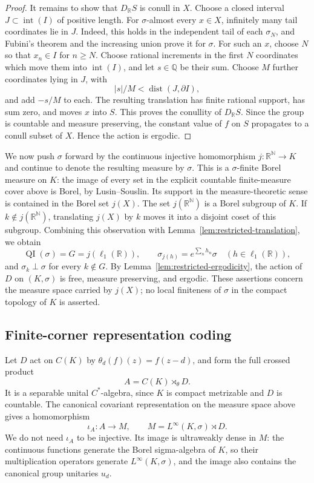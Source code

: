 \documentclass[11pt]{article}
\numberwithin{equation}{section}
\theoremstyle{definition}
\newcommand{\N}{\mathbb N}
\newcommand{\R}{\mathbb R}
\newcommand{\Q}{\mathbb Q}
\newcommand{\QI}{\operatorname{QI}}
\begin{document}
\begin{proof}
It remains to show that $D_{\R}S$ is conull in $X$. Choose a closed
interval $J\subset\operatorname{int}(I)$ of positive length. For
$\sigma$-almost every $x\in X$, infinitely many tail coordinates lie
in $J$. Indeed, this holds in the independent tail of each $\sigma_N$,
and Fubini's theorem and the increasing union prove it for $\sigma$.
For such an $x$, choose $N$ so that $x_n\in I$ for $n\geq N$.
Choose rational increments in the first $N$ coordinates which move them
into $\operatorname{int}(I)$, and let $s\in\Q$ be their sum. Choose
$M$ further coordinates lying in $J$, with
\[
 |s|/M<\operatorname{dist}(J,\partial I),
\]
and add $-s/M$ to each. The resulting translation has finite rational
support, has sum zero, and moves $x$ into $S$. This proves the conullity
of $D_{\R}S$. Since the group is countable and measure preserving, the
constant value of $f$ on $S$ propagates to a conull subset of $X$.
Hence the action is ergodic.
\end{proof}

We now push $\sigma$ forward by the continuous injective homomorphism
$j:\R^{\N}\to K$ and continue to denote the resulting measure by
$\sigma$. This is a $\sigma$-finite Borel measure on $K$: the image of
every set in the explicit countable finite-measure cover above is Borel,
by Lusin--Souslin. Its support in the measure-theoretic sense is contained
in the Borel set $j(X)$. The set $j(\R^{\N})$ is a Borel subgroup of $K$.
If $k\notin j(\R^{\N})$, translating $j(X)$ by $k$ moves it into a
disjoint coset of this subgroup. Combining this observation with
Lemma~\ref{lem:restricted-translation}, we obtain
\begin{equation}
 \QI(\sigma)=G=j(\ell_1(\R)),\qquad
 \sigma_{j(h)}=e^{\sum_n h_n}\sigma\quad(h\in\ell_1(\R)),
 \label{eq:compact-measure-modulus}
\end{equation}
and $\sigma_k\perp\sigma$ for every $k\notin G$. By
Lemma~\ref{lem:restricted-ergodicity}, the action of $D$ on $(K,\sigma)$
is free, measure preserving, and ergodic. These assertions concern the
measure space carried by $j(X)$; no local finiteness of $\sigma$ in the
compact topology of $K$ is asserted.

\subsection{Finite-corner representation coding}
\label{sec:finite-corner}

Let $D$ act on $C(K)$ by $\theta_d(f)(z)=f(z-d)$, and form the full
crossed product
\[
 A=C(K)\rtimes_\theta D.
\]
It is a separable unital $C^*$-algebra, since $K$ is compact metrizable
and $D$ is countable. The canonical covariant representation on the
measure space above gives a homomorphism
\[
 \iota_A:A\longrightarrow M,
 \qquad M=L^\infty(K,\sigma)\rtimes D.
\]
We do not need $\iota_A$ to be injective. Its image is ultraweakly dense
in $M$: the continuous functions generate the Borel sigma-algebra of
$K$, so their multiplication operators generate $L^\infty(K,\sigma)$,
and the image also contains the canonical group unitaries $u_d$.
\end{document}
